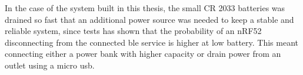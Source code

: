 In the case of the system built in this thesis, the small CR 2033 batteries was drained so fast that an additional power source was needed to keep a stable and reliable system, since tests has shown that the probability of an nRF52 disconnecting from the connected \gls{ble} service is higher at low battery. This meant connecting either a power bank with higher capacity or drain power from an outlet using a micro \gls{usb}. %




